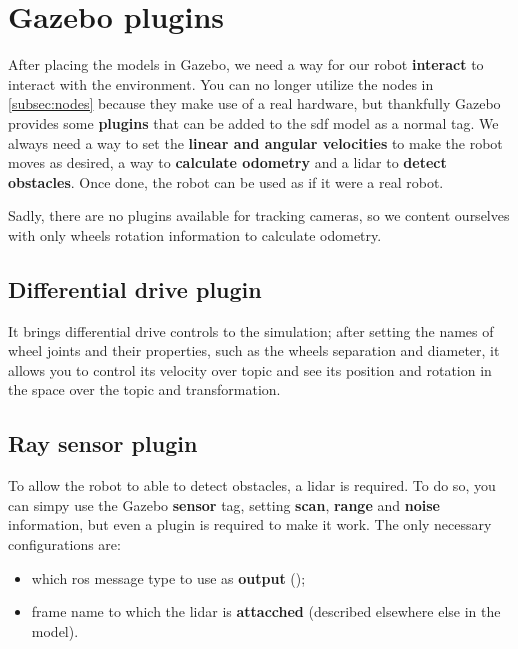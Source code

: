 \section{Gazebo plugins}

After placing the models in Gazebo, we need a way for our robot \textbf{interact} to interact with the environment. You can no longer utilize the nodes in \autoref{subsec:nodes} because they make use of a real hardware, but thankfully Gazebo provides some \textbf{plugins} that can be added to the \acrshort{sdf} model as a normal tag. We always need a way to set the \textbf{linear and angular velocities} to make the robot moves as desired, a way to \textbf{calculate odometry} and a lidar to \textbf{detect obstacles}. Once done, the robot can be used as if it were a real robot.

Sadly, there are no plugins available for tracking cameras, so we content ourselves with only wheels rotation information to calculate odometry. 

\subsection{Differential drive plugin}

It brings differential drive controls to the simulation; after setting the names of wheel joints and their properties, such as the wheels separation and diameter, it allows you to control its velocity over  topic and see its position and rotation in the space over the  topic and transformation.

\subsection{Ray sensor plugin}

To allow the robot to able to detect obstacles, a lidar is required. To do so, you can simpy use the Gazebo \textbf{sensor}  tag, setting \textbf{scan}, \textbf{range} and \textbf{noise} information, but even a plugin is required to make it work. The only necessary configurations are:
\begin{itemize}
    \item which \acrshort{ros} message type to use as \textbf{output} ();
    \item frame name to which the lidar is \textbf{attacched} (described elsewhere else in the model).
\end{itemize}